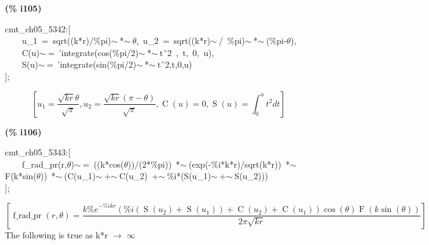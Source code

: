 \documentclass[fleqn]{article}
\begin{document}
\noindent
\begin{minipage}[t]{4.000000em}\color{red}\bfseries
(\% i105)	
\end{minipage}
\begin{minipage}[t]{\textwidth}\color{blue}
cmt\_ch05\_5342:[\\
\ \ \ \ u\_1\ =\ sqrt((k*r)/\%pi)\ensuremath{\sim\ }*\ensuremath{\sim\ }\ensuremath{\theta},\ u\_2\ =\ sqrt((k*r)\ensuremath{\sim\ }/\ \%pi)\ensuremath{\sim\ }*\ensuremath{\sim\ }(\%pi-\ensuremath{\theta}),\\
\ \ \ \ C(u)\ensuremath{\sim\ }=\ 'integrate(cos(\%pi/2)\ensuremath{\sim\ }*\ensuremath{\sim\ }t\^\ 2\ ,\ t,\ 0,\ u),\\
\ \ \ \ S(u)\ensuremath{\sim\ }=\ 'integrate(sin(\%pi/2)\ensuremath{\sim\ }*\ensuremath{\sim\ }t\^\ 2,t,0,u)\\
];
\end{minipage}
\[\displaystyle \tag{\% o105} 
\left[ {u_1}=\frac{\sqrt{k r} \theta }{\sqrt{\ensuremath{\pi} }}\operatorname{,}{u_2}=\frac{\sqrt{k r} \left( \ensuremath{\pi} -\theta \right) }{\sqrt{\ensuremath{\pi} }}\operatorname{,}\operatorname{C}(u)=0\operatorname{,}\operatorname{S}(u)=\int_{0}^{u}{\left. {{t}^{2}}dt\right.}\right] \mbox{}
\]


\noindent
\begin{minipage}[t]{4.000000em}\color{red}\bfseries
(\% i106)	
\end{minipage}
\begin{minipage}[t]{\textwidth}\color{blue}
cmt\_ch05\_5343:[\\
\ \ \ \ f\_rad\_pr(r,\ensuremath{\theta})\ensuremath{\sim\ }=\ ((k*cos(\ensuremath{\theta}))/(2*\%pi))\ *\ensuremath{\sim\ }(exp(-\%i*k*r)/sqrt(k*r))\ *\ensuremath{\sim\ }F(k*sin(\ensuremath{\theta}))\ *\ensuremath{\sim\ }(C(u\_1)\ensuremath{\sim\ }+\ensuremath{\sim\ }C(u\_2)\ +\ensuremath{\sim\ }\%i*(S(u\_1)\ensuremath{\sim\ }+\ensuremath{\sim\ }S(u\_2)))\\
];
\end{minipage}
\[\displaystyle \tag{\% o106} 
\left[ \operatorname{f\_ rad\_ pr}\left( r\operatorname{,}\theta \right) =\frac{k {{\% e}^{-\% i k r}} \left( \% i \left( \operatorname{S}\left( {u_2}\right) +\operatorname{S}\left( {u_1}\right) \right) +\operatorname{C}\left( {u_2}\right) +\operatorname{C}\left( {u_1}\right) \right)  \cos{\left( \theta \right) } \operatorname{F}\left( k \sin{\left( \theta \right) }\right) }{2 \ensuremath{\pi}  \sqrt{k r}}\right] \mbox{}
\]
The following is true as k*r \ensuremath{\longrightarrow} \ensuremath{\infty}
\end{document}
